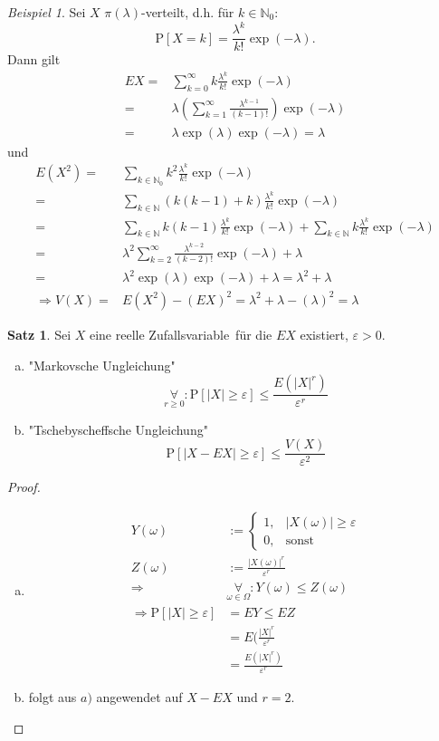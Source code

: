 \documentclass[a4paper,12pt,fleqn]{scrartcl}
\newcommand{\N}{\mathbb{N}}
\newcommand{\ZV}{Zufallsvariable}
\newcommand{\impl}{\Rightarrow}
\newcommand{\fa}[1]{\mathop{\forall}\limits_{#1}}
\theoremstyle{definition}
\newtheorem{satz}[definition]{Satz}
\theoremstyle{plain}
\theoremstyle{remark}
\newtheorem{beispiel}[definition]{Beispiel}
\begin{document}
\begin{beispiel}
Sei $X$ $\pi(\lambda)$-verteilt, d.h. für $k\in\N_0$:
\[\text{P}[X=k]=\frac{\lambda^k}{k!}\exp(-\lambda).\]
Dann gilt
\begin{align*}
EX=&\sum_{k=0}^{\infty}k\frac{\lambda^k}{k!}\exp(-\lambda)\\
=&\lambda(\sum_{k=1}^{\infty}\frac{\lambda^{k-1}}{(k-1)!})\exp(-\lambda)\\
=&\lambda\exp(\lambda)\exp(-\lambda)=\lambda
\end{align*}
und
\begin{align*}
E(X^2)=&\sum_{k\in\N_0}k^2\frac{\lambda^k}{k!}\exp(-\lambda)\\
=&\sum_{k\in\N}(k(k-1)+k)\frac{\lambda^k}{k!}\exp(-\lambda)\\
=&\sum_{k\in\N}k(k-1)\frac{\lambda^k}{k!}\exp(-\lambda)+\sum_{k\in\N}k\frac{\lambda^k}{k!}\exp(-\lambda)\\
=&\lambda^2\sum_{k=2}^{\infty}\frac{\lambda^{k-2}}{(k-2)!}\exp(-\lambda)+\lambda\\
=&\lambda^2\exp(\lambda)\exp(-\lambda)+\lambda=\lambda^2+\lambda\\
\impl V(X)=&E(X^2)-(EX)^2=\lambda^2+\lambda-(\lambda)^2=\lambda
\end{align*}
\end{beispiel}
\begin{satz}
Sei $X$ eine reelle \ZV \, für die $EX$ existiert, $\varepsilon>0$.
\begin{enumerate}[a)]
\item "Markovsche Ungleichung"
\[\fa{r\geq 0}:\text{P}[|X|\geq\varepsilon]\leq\frac{E(|X|^r)}{\varepsilon^r}\]
\item "Tschebyscheffsche Ungleichung"
\[\text{P}[|X-EX|\geq\varepsilon]\leq\frac{V(X)}{\varepsilon^2}\]
\end{enumerate}
\end{satz}
\begin{proof}
\begin{enumerate}[a)]
\item \begin{align*}
Y(\omega)&:=\begin{cases}1,&|X(\omega)|\geq\varepsilon\\
0,&\text{sonst}
\end{cases}\\
Z(\omega)&:=\frac{|X(\omega)|^r}{\varepsilon^r}\\
\impl&\fa{\omega\in\Omega}:Y(\omega)\leq Z(\omega)\\
\impl \text{P}[|X|\geq\varepsilon]&=EY\leq EZ \tag{Monotonie Erwartungswert}\\
&=E(\frac{|X|^r}{\varepsilon^r}\\
&=\frac{E(|X|^r)}{\varepsilon^r}
\end{align*}
\item folgt aus $a)$ angewendet auf $X-EX$ und $r=2$.
\end{enumerate}
\end{proof}
\end{document}

